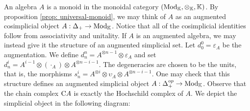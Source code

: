 \documentclass[../thesis.tex]{subfiles}
\begin{document}
            An algebra $A$ is a monoid in the monoidal category $(\tt{Mod}_\mathbb{K}, \otimes_\mathbb{K}, \mathbb{K})$. By proposition \ref{prop: universal-monoid}, we may think of $A$ as an augmented cosimplicial object $A:\Delta_+ \rightarrow \tt{Mod}_\mathbb{K}$. Notice that all of the cosimplicial identities follow from associativity and unitality. If $A$ is an augmented algebra, we may instead give it the structure of an augmented simplicial set. Let $d^0_0 = \varepsilon_A$ be the augmentation. We define $d^n_n = A^{\otimes n-1}\otimes\varepsilon_A$ and set $d^i_n = A^{i-1}\otimes (\cdot_A) \otimes A^{\otimes n-i-1}$. The degeneracies are chosen to be the units, that is, the morphisms $s^i_n = A^{\otimes i}\otimes \upsilon_A \otimes A^{\otimes n-i-1}$. One may check that this structure defines an augmented simplicial object $A:\Delta_+^{op}\rightarrow \tt{Mod}_\mathbb{K}$. Observe that the chain complex $\tt{C}A$ is exactly the Hochschild complex of $A$. We depict the simplicial object in the following diagram:
            \begin{center}

            \end{center}
\end{document}
